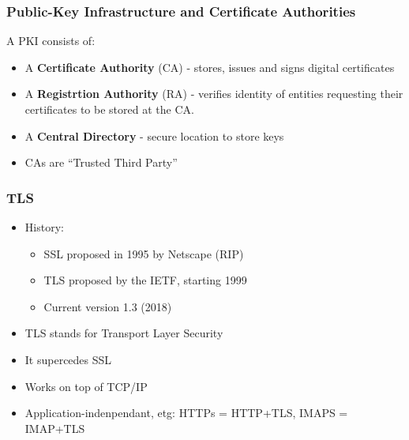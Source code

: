 \documentclass[
hyperref={pdfpagelabels=false}
,xcolor=table
]
{beamer}
\begin{document}
\begin{frame}
  \frametitle{Public-Key Infrastructure and Certificate Authorities}
  A PKI consists of: 
  \begin{itemize}
  \item A \textbf{Certificate Authority} (CA) - stores, issues and signs digital certificates
  \item A \textbf{Registrtion Authority} (RA) - verifies identity of entities requesting their certificates to be stored at the CA. 
  \item A \textbf{Central Directory} - secure location to store keys 
  \end{itemize}

  \begin{itemize}
  \item CAs are ``Trusted Third Party''
  \end{itemize}

  
\end{frame}









\begin{frame}
  \frametitle{TLS}
  \begin{itemize}
  \item History:
    \begin{itemize}
    \item SSL proposed in 1995 by Netscape (RIP)
    \item TLS proposed by the IETF, starting 1999
    \item Current version 1.3 (2018)
    \end{itemize}
  \item TLS stands for Transport Layer Security
  \item It supercedes SSL 
  \item Works on top of TCP/IP
  \item Application-indenpendant, etg: HTTPs = HTTP+TLS, IMAPS = IMAP+TLS
  \end{itemize}
\end{frame}
\end{document}
